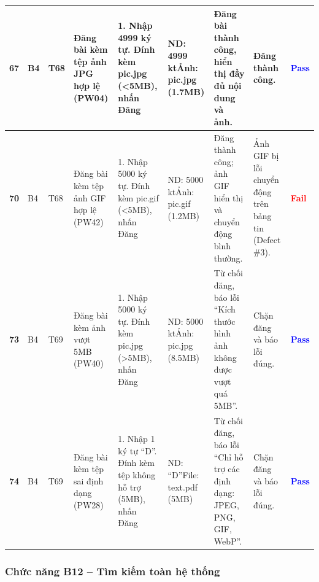 \documentclass[11pt,a4paper]{article}
\begin{document}
\begin{longtable}{|C{0.85cm}|C{0.7cm}|C{0.95cm}|L{2.0cm}|L{3.0cm}|L{2.2cm}|L{2.6cm}|L{2.5cm}|C{0.85cm}|}
\textbf{67} & B4 & T68 & Đăng bài kèm tệp ảnh JPG hợp lệ (PW04) & 1. Nhập 4999 ký tự. Đính kèm pic.jpg (<5MB), nhấn Đăng & ND: 4999 kt\newline Ảnh: pic.jpg (1.7MB) & Đăng bài thành công, hiển thị đầy đủ nội dung và ảnh. & Đăng thành công. & \textcolor{blue}{\textbf{Pass}} \\ \hline
\textbf{70} & B4 & T68 & Đăng bài kèm tệp ảnh GIF hợp lệ (PW42) & 1. Nhập 5000 ký tự. Đính kèm pic.gif (<5MB), nhấn Đăng & ND: 5000 kt\newline Ảnh: pic.gif (1.2MB) & Đăng thành công; ảnh GIF hiển thị và chuyển động bình thường. & Ảnh GIF bị lỗi chuyển động trên bảng tin (Defect \#3). & \textcolor{red}{\textbf{Fail}} \\ \hline
\textbf{73} & B4 & T69 & Đăng bài kèm ảnh vượt 5MB (PW40) & 1. Nhập 5000 ký tự. Đính kèm pic.jpg (>5MB), nhấn Đăng & ND: 5000 kt\newline Ảnh: pic.jpg (8.5MB) & Từ chối đăng, báo lỗi ``Kích thước hình ảnh không được vượt quá 5MB''. & Chặn đăng và báo lỗi đúng. & \textcolor{blue}{\textbf{Pass}} \\ \hline
\textbf{74} & B4 & T69 & Đăng bài kèm tệp sai định dạng (PW28) & 1. Nhập 1 ký tự ``D''. Đính kèm tệp không hỗ trợ (5MB), nhấn Đăng & ND: ``D''\newline File: text.pdf (5MB) & Từ chối đăng, báo lỗi ``Chỉ hỗ trợ các định dạng: JPEG, PNG, GIF, WebP''. & Chặn đăng và báo lỗi đúng. & \textcolor{blue}{\textbf{Pass}} \\ \hline
\end{longtable}
\endgroup

\subsubsection{Chức năng B12 -- Tìm kiếm toàn hệ thống}
\end{document}
